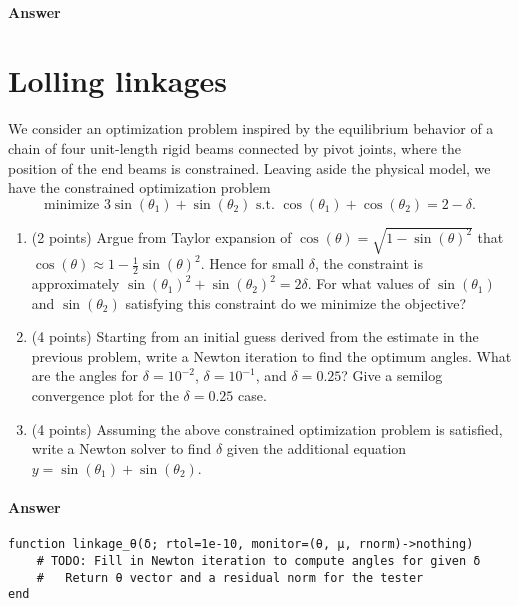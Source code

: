 \documentclass[12pt, leqno]{article} %
\providecommand{\tightlist}{%
  \setlength{\itemsep}{0pt}\setlength{\parskip}{0pt}}
\begin{document}
\paragraph{Answer}

\section{Lolling linkages}

We consider an optimization problem inspired by the equilibrium behavior
of a chain of four unit-length rigid beams connected by pivot joints,
where the position of the end beams is constrained. Leaving aside the
physical model, we have the constrained optimization problem
\[\mbox{minimize } 3 \sin(\theta_1) + \sin(\theta_2)
  \mbox{ s.t. } \cos(\theta_1) + \cos(\theta_2) = 2 - \delta.\]

\begin{enumerate}
\def\labelenumi{\arabic{enumi}.}
\tightlist
\item
  (2 points) Argue from Taylor expansion of
  \(\cos(\theta) = \sqrt{1-\sin(\theta)^2}\) that
  \(\cos(\theta) \approx 1 - \frac{1}{2} \sin(\theta)^2\). Hence for
  small \(\delta\), the constraint is approximately
  \(\sin(\theta_1)^2 + \sin(\theta_2)^2 = 2 \delta\). For what values of
  \(\sin(\theta_1)\) and \(\sin(\theta_2)\) satisfying this constraint
  do we minimize the objective?
\item
  (4 points) Starting from an initial guess derived from the estimate in
  the previous problem, write a Newton iteration to find the optimum
  angles. What are the angles for \(\delta = 10^{-2}\),
  \(\delta = 10^{-1}\), and \(\delta = 0.25\)? Give a semilog
  convergence plot for the \(\delta = 0.25\) case.
\item
  (4 points) Assuming the above constrained optimization problem is
  satisfied, write a Newton solver to find \(\delta\) given the
  additional equation \(y = \sin(\theta_1) + \sin(\theta_2)\).
\end{enumerate}

\paragraph{Answer}

\begin{verbatim}
function linkage_θ(δ; rtol=1e-10, monitor=(θ, μ, rnorm)->nothing)
    # TODO: Fill in Newton iteration to compute angles for given δ
    #   Return θ vector and a residual norm for the tester    
end
\end{verbatim}
\end{document}
